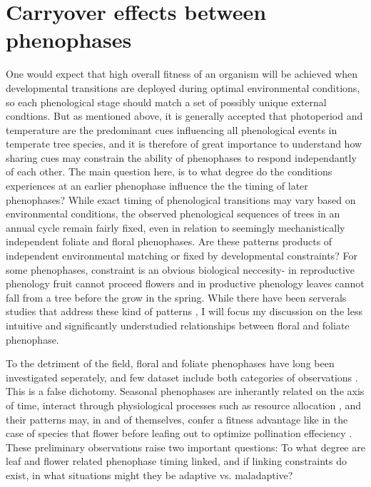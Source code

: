 \documentclass{article}\usepackage[]{graphicx}\usepackage[]{color}
\begin{document}
\section{Carryover effects between phenophases}
One would expect that high overall fitness of an organism will be achieved when developmental transitions are deployed during optimal environmental conditions, so each phenological stage should match a set of possibly unique external condtions. But as mentioned above, it is generally accepted that photoperiod and temperature are the predominant cues influencing all phenological events in temperate tree species, and it is therefore of great importance to understand how sharing cues may constrain the ability of phenophases to respond independantly of each other. The main question here, is to what degree do the conditions experiences at an earlier phenophase influence the the timing of later phenophases? While exact timing of phenological transitions may vary based on environmental conditions, the observed phenological sequences of trees in an annual cycle remain fairly fixed, even in relation to seemingly mechanistically independent foliate and floral phenophases. Are these patterns products of independent environmental matching or fixed by developmental constraints? For some phenophases, constraint is an obvious biological neccesity- in reproductive phenology fruit cannot proceed flowers and in productive phenology leaves cannot fall from a tree before the grow in the spring. While there have been serverals studies that address these kind of patterns \citep{Richardson something, Primack something}, I will focus my discussion on the less intuitive and significantly understudied relationships between floral and foliate phenophase.
\par To the detriment of the field, floral and foliate phenophases have long been investigated seperately, and few dataset include both categories of observations \citep{Wolkovich and Ettinger}. This is a false dichotomy. Seasonal phenophases are inherantly related on the axis of time, interact through physiological processes such as resource allocation \cite{}, and their patterns may, in and of themselves, confer a fitness advantage like in the case of species that flower before leafing out to optimize pollination effeciency \citep{}. These preliminary observations raise two important questions: To what degree are leaf and flower related phenophase timing linked, and if linking constraints do exist, in what situations might they be adaptive vs. maladaptive?
\end{document}
